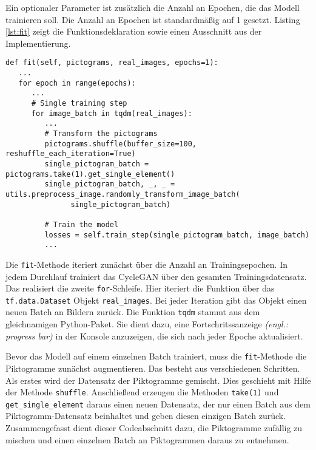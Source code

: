 Ein optionaler Parameter ist zusätzlich die Anzahl an Epochen, die das Modell trainieren soll. Die Anzahl an Epochen ist standardmäßig auf 1 gesetzt. Listing \ref{lst:fit} zeigt die Funktionsdeklaration sowie einen Ausschnitt aus der Implementierung.

\begin{code}
   \begin{verbatim}
def fit(self, pictograms, real_images, epochs=1):
   ...
   for epoch in range(epochs):
      ...
      # Single training step
      for image_batch in tqdm(real_images):
         ...
         # Transform the pictograms
         pictograms.shuffle(buffer_size=100, reshuffle_each_iteration=True)
         single_pictogram_batch = pictograms.take(1).get_single_element()
         single_pictogram_batch, _, _ = utils.preprocess_image.randomly_transform_image_batch(
               single_pictogram_batch)

         # Train the model
         losses = self.train_step(single_pictogram_batch, image_batch)
         ...
   \end{verbatim}
   \label{lst:fit}
\end{code}

Die \texttt{fit}-Methode iteriert zunächst über die Anzahl an Trainingsepochen. In jedem Durchlauf trainiert das \ac{CycleGAN} über den gesamten Trainingsdatensatz. Das realisiert die zweite \texttt{for}-Schleife. Hier iteriert die Funktion über das \texttt{tf.data.Dataset} Objekt \texttt{real_images}. Bei jeder Iteration gibt das Objekt einen neuen Batch an Bildern zurück. Die Funktion \texttt{tqdm} stammt aus dem gleichnamigen Python-Paket. Sie dient dazu, eine Fortschritssanzeige \emph{(engl.: progress bar)} in der Konsole anzuzeigen, die sich nach jeder Epoche aktualisiert.

Bevor das Modell auf einem einzelnen Batch trainiert, muss die \texttt{fit}-Methode die Piktogramme zunächst augmentieren. Das besteht aus verschiedenen Schritten. Als erstes wird der Datensatz der Piktogramme gemischt. Dies geschieht mit Hilfe der Methode \texttt{shuffle}. Anschließend erzeugen die Methoden \texttt{take(1)} und \texttt{get_single_element} daraus einen neuen Datensatz, der nur einen Batch aus dem Piktogramm-Datensatz beinhaltet und geben diesen einzigen Batch zurück. Zusammengefasst dient dieser Codeabschnitt dazu, die Piktogramme zufällig zu mischen und einen einzelnen Batch an Piktogrammen daraus zu entnehmen.

